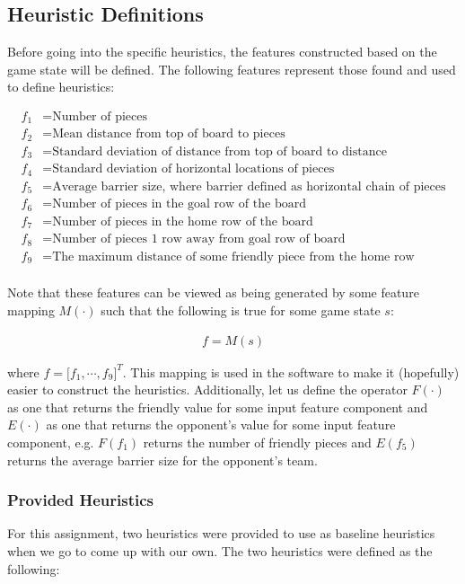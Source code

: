 \documentclass{article}[12pt]
\begin{document}
   \subsection{Heuristic Definitions}
   Before going into the specific heuristics, the features constructed based on the game state will be defined. The following features represent those found and used to define heuristics:
   
   \begin{align*}
   f_1 &= \text{Number of pieces} \\
   f_2 &= \text{Mean distance from top of board to pieces} \\
   f_3 &= \text{Standard deviation of distance from top of board to distance} \\
   f_4 &= \text{Standard deviation of horizontal locations of pieces}\\
   f_5 &= \text{Average barrier size, where barrier defined as horizontal chain of pieces}\\
   f_6 &= \text{Number of pieces in the goal row of the board}\\
   f_7 &= \text{Number of pieces in the home row of the board}\\
   f_8 &= \text{Number of pieces 1 row away from goal row of board}\\
   f_9 &= \text{The maximum distance of some friendly piece from the home row}\\
   \end{align*}
   
    Note that these features can be viewed as being generated by some feature mapping $M(\cdot)$ such that the following is true for some game state $s$:
   
   \begin{align*}
   f = M(s)
   \end{align*}
   
   where $f = \lbrack f_1, \cdots, f_9\rbrack^{T}$. This mapping is used in the software to make it (hopefully) easier to construct the heuristics. Additionally, let us define the operator $F(\cdot)$ as one that returns the friendly value for some input feature component and $E(\cdot)$ as one that returns the opponent's value for some input feature component, e.g. $F(f_1)$ returns the number of friendly pieces and $E(f_5)$ returns the average barrier size for the opponent's team.
   
   \subsubsection{Provided Heuristics}
   For this assignment, two heuristics were provided to use as baseline heuristics when we go to come up with our own. The two heuristics were defined as the following:
   
\end{document}

